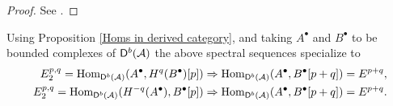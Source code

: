 \begin{proof}
    See \cite[\S 2, Example 2.70]{huybrechts2006fouriermukai}.
\end{proof}

\begin{remark}
    Using Proposition \ref{Homs in derived category}, and taking $A^\bullet$ and $B^\bullet$ to be bounded complexes of $\mathsf{D}^b(\mathcal A)$ the above spectral sequences specialize to 
    \begin{align}
        E^{p,q}_2 = \operatorname{Hom}_{\mathsf{D}^b(\mathcal A)}(A^\bullet, H^q(B^\bullet)[p]) &\Rightarrow \operatorname{Hom}_{\mathsf{D}^b(\mathcal A)}(A^\bullet, B^\bullet[p+q]) = E^{p+q}, \\
        E^{p,q}_2 = \operatorname{Hom}_{\mathsf{D}^b(\mathcal A)}(H^{-q}(A^\bullet), B^\bullet[p]) &\Rightarrow \operatorname{Hom}_{\mathsf{D}^b(\mathcal A)}(A^\bullet, B^\bullet[p+q]) = E^{p+q}. 
        \label{eq: Spectral sequence derived hom 1}
    \end{align}
\end{remark}